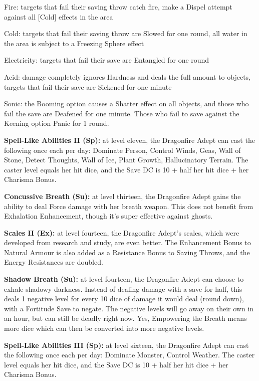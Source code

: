 \begin{itemize*}
\item Fire: targets that fail their saving throw catch fire, make a Dispel attempt against all [Cold] effects in the area
\item Cold: targets that fail their saving throw are Slowed for one round, all water in the area is subject to a Freezing Sphere effect
\item Electricity: targets that fail their save are Entangled for one round
\item Acid: damage completely ignores Hardness and deals the full amount to objects, targets that fail their save are Sickened for one minute
\item Sonic: the Booming option causes a Shatter effect on all objects, and those who fail the save are Deafened for one minute. Those who fail to save against the Keening option Panic for 1 round.
\end{itemize*}

\textbf{Spell-Like Abilities II (Sp):} at level eleven, the Dragonfire Adept can cast the following once each per day: Dominate Person, Control Winds, Geas, Wall of Stone, Detect Thoughts, Wall of Ice, Plant Growth, Hallucinatory Terrain. The caster level equals her hit dice, and the Save DC is 10 + half her hit dice + her Charisma Bonus.

\textbf{Concussive Breath (Su):} at level thirteen, the Dragonfire Adept gains the ability to deal Force damage with her breath weapon. This does not benefit from Exhalation Enhancement, though it's super effective against ghosts.

\textbf{Scales II (Ex):} at level fourteen, the Dragonfire Adept's scales, which were developed from research and study, are even better. The Enhancement Bonus to Natural Armour is also added as a Resistance Bonus to Saving Throws, and the Energy Resistances are doubled.

\textbf{Shadow Breath (Su):} at level fourteen, the Dragonfire Adept can choose to exhale shadowy darkness. Instead of dealing damage with a save for half, this deals 1 negative level for every 10 dice of damage it would deal (round down), with a Fortitude Save to negate. The negative levels will go away on their own in an hour, but can still be deadly right now. Yes, Empowering the Breath means more dice which can then be converted into more negative levels.

\textbf{Spell-Like Abilities III (Sp):} at level sixteen, the Dragonfire Adept can cast the following once each per day: Dominate Monster, Control Weather. The caster level equals her hit dice, and the Save DC is 10 + half her hit dice + her Charisma Bonus.

